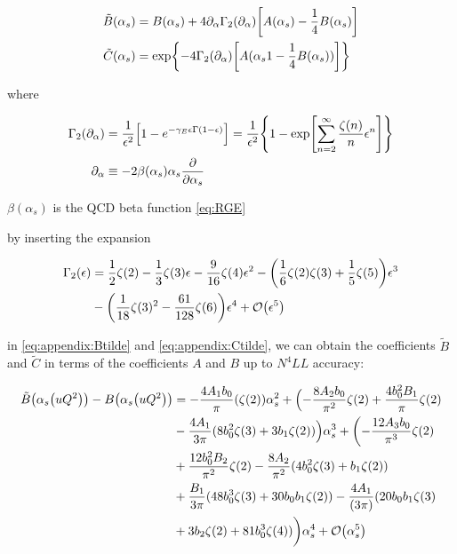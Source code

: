 \documentclass[../main.tex]{subfiles}
\begin{document}
\begin{align}
\tilde{B}(\alpha_s) &= B(\alpha_s) + 4 \partial_\alpha \Gamma_2(\partial_\alpha) \qty[A(\alpha_s)-\frac{1}{4} B(\alpha_s)] \label{eq:appendix:Btilde}\\ 
\tilde{C}(\alpha_s) &= \exp{-4\Gamma_2(\partial_\alpha) \qty[A(\alpha_s1-\frac{1}{4} B(\alpha_s))]} \label{eq:appendix:Ctilde}
\end{align}

where 

\begin{align}
    \Gamma_2(\partial_\alpha) &= \frac{1}{\epsilon^2}\qty[1-e^{-\gamma_E \epsilon \Gamma(1-\epsilon)}] = \frac{1}{\epsilon^2}\qty{1-\exp[\sum_{n=2}^\infty \frac{\zeta(n)}{n}\epsilon^n] }\\
    \partial_\alpha &\equiv -2\beta(\alpha_s)\alpha_s \pdv{\alpha_s}
\end{align}

$\beta(\alpha_s)$ is the QCD beta function \cref{eq:RGE}

by inserting the expansion 

\begin{align}
    \begin{split}
    \Gamma_2(\epsilon) &= \frac{1}{2}\zeta(2) -\frac{1}{3}\zeta(3) \epsilon - \frac{9}{16}\zeta(4) \epsilon^2 - \qty(\frac{1}{6}\zeta(2)\zeta(3)+ \frac{1}{5}\zeta(5))\epsilon^3 \\
    &- \qty(\frac{1}{18}\zeta(3)^2 - \frac{61}{128}\zeta(6))\epsilon^4 + \order{\epsilon^5}   
    \end{split}
\end{align}

in \cref{eq:appendix:Btilde} and \cref{eq:appendix:Ctilde}, we can obtain the coefficients $\tilde{B}$ and $\tilde{C}$ in terms of the coefficients $A$ and $B$ up to $N^4LL$ accuracy: 

\begin{align}
    \begin{split}
    \tilde{B}\qty(\alpha_s \qty(u Q^2)) - B\qty(\alpha_s \qty(u Q^2)) &= -\frac{4 A_1 b_0}{\pi} (\zeta(2)) \alpha_s^2 + \Bigl(-\frac{8 A_2 b_0}{\pi^2} \zeta(2) + \frac{4 b_0^2 B_1}{\pi} \zeta(2) \\
    &- \frac{4 A_1}{3\pi}(8 b_0^2 \zeta(3) + 3 b_1 \zeta(2))\Bigr) \alpha_s^3 + \biggl(-\frac{12 A_3 b_0}{\pi^3} \zeta(2) \\
    &+ \frac{12 b_0^2 B_2}{\pi^2} \zeta(2) - \frac{8 A_2}{\pi^2} (4 b_0^2 \zeta(3) + b_1 \zeta(2)) \\
    &+ \frac{B_1}{3 \pi}(48 b_0^3 \zeta(3) +  30 b_0 b_1 \zeta(2)) - \frac{4 A_1}{(3 \pi)} (20 b_0 b_1 \zeta(3) \\
    &+ 3 b_2 \zeta(2) + 81 b_0^3 \zeta(4)) \biggr) \alpha_s^4 + \order{\alpha_s^5}
    \end{split}
\end{align}
\end{document}
